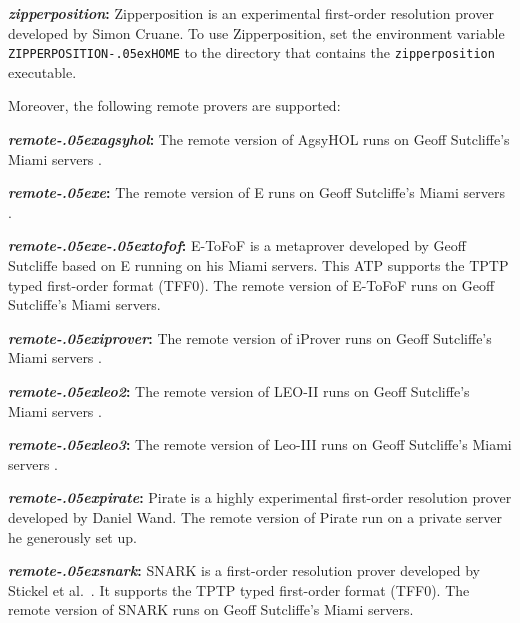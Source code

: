 \documentclass[a4paper,12pt]{article}
\renewcommand\_{\hbox{\textunderscore\kern-.05ex}}
\begin{document}
\begin{enum}
\begin{sloppy}
\begin{enum}
\item[\labelitemi] \textbf{\textit{zipperposition}:} Zipperposition
\cite{cruanes-2014} is an experimental first-order resolution prover developed
by Simon Cruane. To use Zipperposition, set the environment variable
\texttt{ZIPPERPOSITION\_HOME} to the directory that contains the
\texttt{zipperposition} executable.
\end{enum}

\end{sloppy}

Moreover, the following remote provers are supported:

\begin{enum}
\item[\labelitemi] \textbf{\textit{remote\_agsyhol}:} The remote version of
AgsyHOL runs on Geoff Sutcliffe's Miami servers \cite{sutcliffe-2000}.

\item[\labelitemi] \textbf{\textit{remote\_e}:} The remote version of E runs
on Geoff Sutcliffe's Miami servers \cite{sutcliffe-2000}.

\item[\labelitemi] \textbf{\textit{remote\_e\_tofof}:} E-ToFoF is a metaprover
developed by Geoff Sutcliffe \cite{tofof} based on E running on his Miami
servers. This ATP supports the TPTP typed first-order format (TFF0). The
remote version of E-ToFoF runs on Geoff Sutcliffe's Miami servers.

\item[\labelitemi] \textbf{\textit{remote\_iprover}:} The
remote version of iProver runs on Geoff Sutcliffe's Miami servers
\cite{sutcliffe-2000}.

\item[\labelitemi] \textbf{\textit{remote\_leo2}:} The remote version of LEO-II
runs on Geoff Sutcliffe's Miami servers \cite{sutcliffe-2000}.

\item[\labelitemi] \textbf{\textit{remote\_leo3}:} The remote version of Leo-III
runs on Geoff Sutcliffe's Miami servers \cite{sutcliffe-2000}.

\item[\labelitemi] \textbf{\textit{remote\_pirate}:} Pirate is a
highly experimental first-order resolution prover developed by Daniel Wand.
The remote version of Pirate run on a private server he generously set up.

\item[\labelitemi] \textbf{\textit{remote\_snark}:} SNARK is a first-order
resolution prover developed by Stickel et al.\ \cite{snark}. It supports the
TPTP typed first-order format (TFF0). The remote version of SNARK runs on
Geoff Sutcliffe's Miami servers.


\end{enum}
\end{enum}
\end{document}
